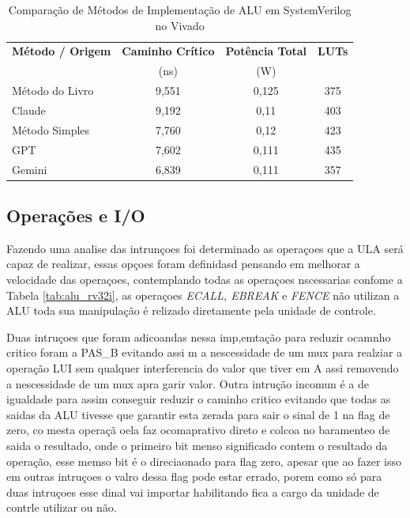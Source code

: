 \begin{table}[!htb]
  \centering
  \caption{Comparação de Métodos de Implementação de ALU em SystemVerilog no Vivado}
  \label{tab:alu_comparacao}
  \begin{tabular}{l c c c  }
    \toprule
    \textbf{Método / Origem} & \textbf{Caminho Crítico} & \textbf{Potência Total}  & \textbf{LUTs} \\
                             & (ns)                    & (W)                      &               \\
    \midrule
    Método do Livro          & 9,551                   & 0,125                   & 375            \\
    Claude                   & 9,192                   & 0,11                    & 403             \\
    Método Simples           & 7,760                   & 0,12                    & 423            \\
    GPT                      & 7,602                   & 0,111                   & 435            \\
    Gemini                   & 6,839                  & 0,111                   & 357            \\
    \bottomrule
  \end{tabular}
\end{table}


\subsection{Operações e I/O}
\label{sub:operacoes}

Fazendo uma analise das intrunçoes foi determinado as operaçoes que a ULA será capaz de realizar, essas opçoes foram definidasd pensando em melhorar a velocidade das operaçoes, contemplando todas as operaçoes nscessarias confome a Tabela \ref{tab:alu_rv32i}, as operaçoes \textit{ECALL, EBREAK} e \textit{FENCE} não utilizan a ALU toda sua manipulação é relizado diretamente pela unidade de controle. 

Duas intruçoes que foram adicoandas nessa imp,emtação para reduzir ocamnho critico foram a PAS\_B evitando assi m a nescessidade de um mux para realziar a operação LUI sem qualquer interferencia do valor que tiver em A assi removendo a nescessidade de um mux apra garir valor. Outra intrução incomun é a de igualdade para assim conseguir reduzir o caminho critico evitando que todas as saidas da ALU tivesse que garantir esta zerada para sair o sinal de 1 na flag de zero, co mesta operaçã oela faz  ocomaprativo direto e colcoa no baramenteo de saida o resultado, onde o primeiro bit menso significado contem o resultado da operação, esse memso bit é o direciaonado para flag zero, apesar que ao fazer isso em outras intruçoes o valro dessa flag pode estar errado, porem como só para duas intruçoes esse dinal vai importar habilitando fica a cargo da unidade de contrle utilizar ou não. 


